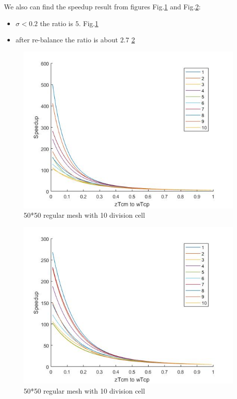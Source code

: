 We also can find the speedup result from figures Fig.\ref{voronoicurve} and Fig.\ref{voronoisavecurve}:
\\
\begin{itemize}
\item $\sigma < 0.2$ the ratio is $5$. Fig.\ref{voronoicurve}
\item after re-balance the ratio is about $2.7$ \ref{voronoisavecurve}
\end{itemize}

\begin{figure}[h]
\centering\includegraphics[width=0.8\linewidth]{figure/voronoi_curve}
\caption{50*50 regular mesh with 10 division cell}
\label{voronoicurve}
\end{figure}

\begin{figure}[h]
\centering\includegraphics[width=0.8\linewidth]{figure/voronoi_curve2}
\caption{50*50 regular mesh with 10 division cell}
\label{voronoisavecurve}
\end{figure}












